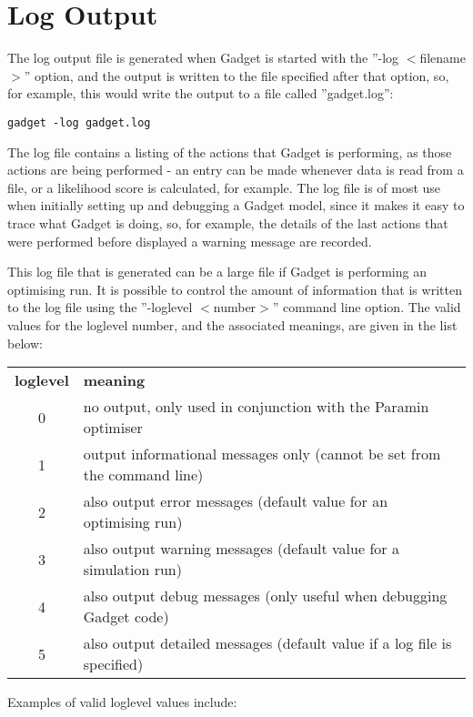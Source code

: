\documentclass[10pt,twoside]{book}
\begin{document}
\section{Log Output}\label{sec:logoutput}
The log output file is generated when Gadget is started with the ''-log $<$filename$>$'' option, and the output is written to the file specified after that option, so, for example, this would write the output to a file called ''gadget.log'':

{\small\begin{verbatim}
gadget -log gadget.log
\end{verbatim}}

The log file contains a listing of the actions that Gadget is performing, as those actions are being performed - an entry can be made whenever data is read from a file, or a likelihood score is calculated, for example.  The log file is of most use when initially setting up and debugging a Gadget model, since it makes it easy to trace what Gadget is doing, so, for example, the details of the last actions that were performed before displayed a warning message are recorded.

\bigskip
This log file that is generated can be a large file if Gadget is performing an optimising run.  It is possible to control the amount of information that is written to the log file using the ''-loglevel $<$number$>$'' command line option.  The valid values for the loglevel number, and the associated meanings, are given in the list below:

\bigskip
\begin{tabular}{cl}
{\bf loglevel} & {\bf meaning} \\
0 & no output, only used in conjunction with the Paramin optimiser \\
1 & output informational messages only (cannot be set from the command line) \\
2 & also output error messages (default value for an optimising run) \\
3 & also output warning messages (default value for a simulation run) \\
4 & also output debug messages (only useful when debugging Gadget code) \\
5 & also output detailed messages (default value if a log file is specified) \\
\end{tabular}

\bigskip
Examples of valid loglevel values include:
\end{document}
